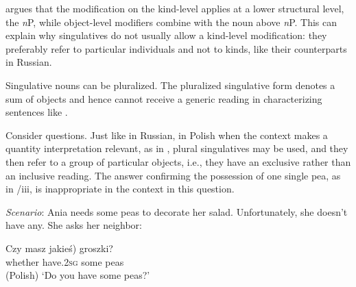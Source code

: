 \documentclass[output=paper,colorlinks,citecolor=brown]{langscibook}
\begin{document}
\citet{Wagiel2014} argues that the modification on the kind-level applies at a lower structural level, the \textit{n}P, while object-level modifiers combine with the noun above \textit{n}P. This can explain why singulatives do not usually allow a kind-level modi\-fication: they preferably refer to particular individuals and not to kinds, like their counterparts in Russian. 

\newpage
Singulative nouns can be pluralized. The pluralized singulative form denotes a sum of objects and hence cannot receive a generic reading in characterizing sentences like .

\label{ex:geist:31}
\z

\noindent Consider questions. Just like in Russian, in Polish when the context makes a quantity interpretation relevant, as in , plural singulatives may be used, and they then refer to a group of particular objects, i.e., they have an exclusive rather than an inclusive reading. The answer confirming the possession of one single pea, as in /iii, is inappropriate in the context in this question.

\eanoraggedright\label{ex:geist:32} \textit{Scenario}: Ania needs some peas to decorate her salad. Unfortunately, she doesn't have any. She asks her neighbor:
\begin{xlist}
\gll Czy masz \minsp{(} jakieś) groszki? \\ 
whether have.\textsc{2sg} {} some peas \\ \hfill (Polish)
\glt `Do you have some peas?' \label{ex:geist:32A:}
\label{ex:geist:32B}
\end{xlist}
\z
\end{document}
